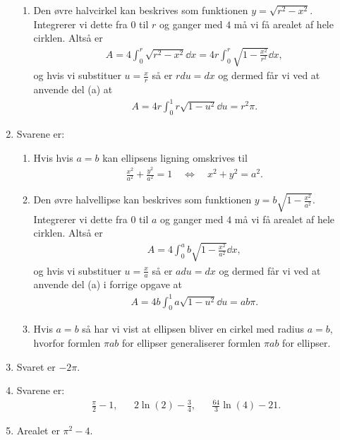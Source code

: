 \begin{enumerate}
\begin{enumerate}
		\item Den øvre halvcirkel kan beskrives som funktionen $y=\sqrt{r^2-x^2}$. Integrerer vi dette fra $0$ til $r$ og ganger med $4$ må vi få arealet af hele cirklen. Altså er
		\begin{align*}
		A=4\int_0^r \sqrt{r^2-x^2}\dd x=4r\int_0^r \sqrt{1-\frac{x^2}{r^2}}\dd x,
		\end{align*}
		og hvis vi substituer $u=\frac{x}{r}$ så er $r du=dx$ og dermed får vi ved at anvende del (a) at
		\begin{align*}
		A=4r\int_0^1 r\sqrt{1-u^2}\dd u=r^2\pi.
		\end{align*}
	\end{enumerate}
	\item Svarene er:
			\begin{enumerate}
				\item Hvis hvis $a=b$ kan ellipsens ligning omskrives til
				\begin{align*}
				\frac{x^2}{a^2}+\frac{y^2}{a^2}=1\quad\Leftrightarrow\quad x^2+y^2=a^2.
				\end{align*}
				\item Den øvre halvellipse kan beskrives som funktionen $y=b\sqrt{1-\frac{x^2}{a^2}}$. Integrerer vi dette fra $0$ til $a$ og ganger med $4$ må vi få arealet af hele cirklen. Altså er
				\begin{align*}
				A=4\int_0^a b\sqrt{1-\frac{x^2}{a^2}}\dd x,
				\end{align*}
				og hvis vi substituer $u=\frac{x}{a}$ så er $a du=dx$ og dermed får vi ved at anvende del (a) i forrige opgave at
				\begin{align*}
				A=4b\int_0^1  a\sqrt{1-u^2}\dd u=ab\pi.
				\end{align*}
						
				\item Hvis $a=b$ så har vi vist at ellipsen bliver en cirkel med radius $a=b$, hvorfor formlen $\pi ab$ for ellipser generaliserer formlen $\pi ab$ for ellipser.
			\end{enumerate}

	\item Svaret er $-2\pi$.
	
		\item Svarene er:
	\begin{align*}
	\frac{\pi}{2}-1,&&  2\ln(2)-\frac{3}{4},&& \frac{64}{3}\ln(4)-21.
	\end{align*}
	
		\item Arealet er $\pi^2-4$.
		

\end{enumerate}
